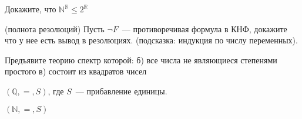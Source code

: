 \begin{ptask}{9}
    Докажите, что $\mathbb{N}^{\mathbb{R}} \le 2^{\mathbb{R}}$
\end{ptask}


\begin{ptask}{10} (полнота резолюций)
    Пусть $\neg F$~--- противоречивая формула в КНФ, докажите что у нее есть вывод в 
    резолюциях. (подсказка: индукция по числу переменных).
\end{ptask}

\begin{ptask}{13}
    Предъявите теорию спектр которой:
    б) все числа не являющиеся степенями простого
    в) состоит из квадратов чисел
\end{ptask}

\begin{ptask}{19}
    $(\mathbb{Q}, =, S)$, где $S$~--- прибавление единицы.
\end{ptask}

\begin{ptask}{20}
    $(\mathbb{N}, =, S)$
\end{ptask}